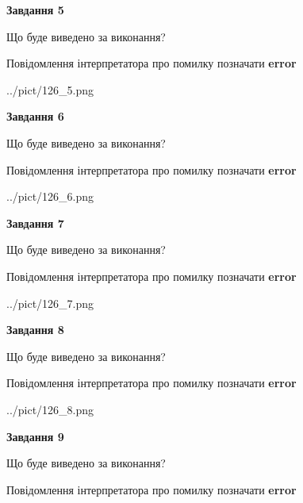 \documentclass[11pt, ukrainian]{article}
\begin{document}
{\begin {large}
{\begin {center}\textbf{Завдання 5}\end {center}}\par
Що буде виведено за виконання? \par
Повідомлення інтерпретатора про помилку позначати \textbf{error}

\begin{center}
	{../pict/126_5.png}
\end{center}
\newpage

{\begin {center}\textbf{Завдання 6}\end {center}}\par
Що буде виведено за виконання? \par
Повідомлення інтерпретатора про помилку позначати \textbf{error}

\begin{center}
	{../pict/126_6.png}
\end{center}
\newpage

{\begin {center}\textbf{Завдання 7}\end {center}}\par
Що буде виведено за виконання? \par
Повідомлення інтерпретатора про помилку позначати \textbf{error}

\begin{center}
	{../pict/126_7.png}
\end{center}
\newpage

{\begin {center}\textbf{Завдання 8}\end {center}}\par
Що буде виведено за виконання? \par
Повідомлення інтерпретатора про помилку позначати \textbf{error}

\begin{center}
	{../pict/126_8.png}
\end{center}
\newpage

{\begin {center}\textbf{Завдання 9}\end {center}}\par
Що буде виведено за виконання? \par
Повідомлення інтерпретатора про помилку позначати \textbf{error}


\end{large}}
\end{document}

